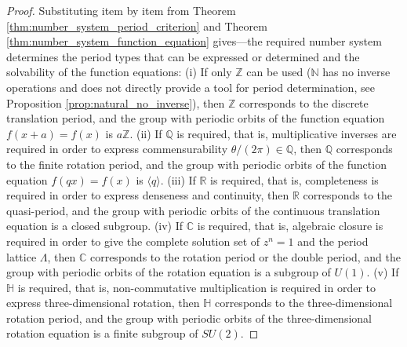 \begin{proof}
Substituting item by item from Theorem \ref{thm:number_system_period_criterion} and Theorem \ref{thm:number_system_function_equation} gives---the required number system determines the period types that can be expressed or determined and the solvability of the function equations:
(i) If only $\mathbb{Z}$ can be used ($\mathbb{N}$ has no inverse operations and does not directly provide a tool for period determination, see Proposition \ref{prop:natural_no_inverse}), then $\mathbb{Z}$ corresponds to the discrete translation period, and the group with periodic orbits of the function equation $f(x+a)=f(x)$ is $a\mathbb{Z}$.
(ii) If $\mathbb{Q}$ is required, that is, multiplicative inverses are required in order to express commensurability $\theta/(2\pi)\in\mathbb{Q}$, then $\mathbb{Q}$ corresponds to the finite rotation period, and the group with periodic orbits of the function equation $f(qx)=f(x)$ is $\langle q\rangle$.
(iii) If $\mathbb{R}$ is required, that is, completeness is required in order to express denseness and continuity, then $\mathbb{R}$ corresponds to the quasi-period, and the group with periodic orbits of the continuous translation equation is a closed subgroup.
(iv) If $\mathbb{C}$ is required, that is, algebraic closure is required in order to give the complete solution set of $z^n = 1$ and the period lattice $\Lambda$, then $\mathbb{C}$ corresponds to the rotation period or the double period, and the group with periodic orbits of the rotation equation is a subgroup of $U(1)$.
(v) If $\mathbb{H}$ is required, that is, non-commutative multiplication is required in order to express three-dimensional rotation, then $\mathbb{H}$ corresponds to the three-dimensional rotation period, and the group with periodic orbits of the three-dimensional rotation equation is a finite subgroup of $SU(2)$.
\end{proof}

